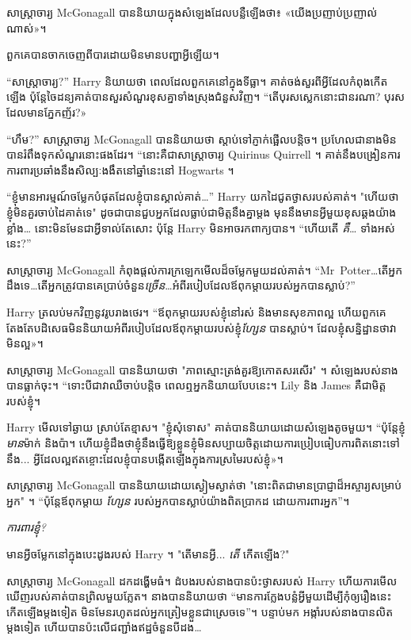 សាស្ត្រាចារ្យ McGonagall បាន​និយាយ​ក្នុង​សំឡេង​ដែល​បន្លឺ​ឡើង​ថា​៖ «យើង​ប្រញាប់​ប្រញាល់​ណាស់»។

ពួកគេបានចាកចេញពីបារដោយមិនមានបញ្ហាអ្វីឡើយ។

“សាស្រ្តាចារ្យ?” Harry និយាយ​ថា ពេល​ដែល​ពួក​គេ​នៅ​ក្នុង​ទីធ្លា។ គាត់​ចង់​សួរ​ពី​អ្វី​ដែល​កំពុង​កើត​ឡើង ប៉ុន្តែ​ចៃដន្យ​គាត់​បាន​សួរ​សំណួរ​ខុស​គ្នា​ទាំង​ស្រុង​ជំនួស​វិញ។ “តើបុរសស្លេកនោះជានរណា? បុរស​ដែល​មាន​ភ្នែក​ញ័រ​?»

“ហឹម?” សាស្រ្តាចារ្យ McGonagall បាននិយាយថា ស្តាប់ទៅភ្ញាក់ផ្អើលបន្តិច។ ប្រហែល​ជា​នាង​មិន​បាន​រំពឹង​ទុក​សំណួរ​នោះ​ផង​ដែរ។ “នោះគឺជាសាស្រ្តាចារ្យ Quirinus Quirrell ។ គាត់នឹងបង្រៀនការការពារប្រឆាំងនឹងសិល្បៈងងឹតនៅឆ្នាំនេះនៅ Hogwarts ។

“ខ្ញុំមានអារម្មណ៍ចម្លែកបំផុតដែលខ្ញុំបានស្គាល់គាត់…” Harry យកដៃជូតថ្ងាសរបស់គាត់។ "ហើយថាខ្ញុំមិនគួរចាប់ដៃគាត់ទេ" ដូច​ជា​បាន​ជួប​អ្នក​ដែល​ធ្លាប់​ជា​មិត្ត​នឹង​គ្នា​ម្តង មុន​នឹង​មាន​អ្វី​មួយ​ខុស​ឆ្គង​យ៉ាង​ខ្លាំង… នោះ​មិន​មែន​ជា​អ្វី​ទាល់​តែ​សោះ ប៉ុន្តែ Harry មិន​អាច​រក​ពាក្យ​បាន។ “ហើយតើ \emph{គឺ}… ទាំងអស់នេះ?”

សាស្រ្តាចារ្យ McGonagall កំពុងផ្តល់ការក្រឡេកមើលដ៏ចម្លែកមួយដល់គាត់។ “Mr~Potter…តើអ្នកដឹងទេ…តើអ្នកត្រូវបានគេប្រាប់ចំនួន\emph{ច្រើន}…អំពីរបៀបដែលឪពុកម្តាយរបស់អ្នកបានស្លាប់?”

Harry ត្រលប់មកវិញនូវរូបរាងថេរ។ “ឪពុកម្តាយរបស់ខ្ញុំនៅរស់ និងមានសុខភាពល្អ ហើយពួកគេតែងតែបដិសេធមិននិយាយអំពីរបៀបដែលឪពុកម្តាយរបស់ខ្ញុំ\emph{ហ្សែន} បានស្លាប់។ ដែល​ខ្ញុំ​សន្និដ្ឋាន​ថា​វា​មិន​ល្អ»។

សាស្រ្តាចារ្យ McGonagall បាននិយាយថា "ភាពស្មោះត្រង់គួរឱ្យកោតសរសើរ" ។ សំឡេងរបស់នាងបានធ្លាក់ចុះ។ “ទោះបីជាវាឈឺចាប់បន្តិច ពេលឮអ្នកនិយាយបែបនេះ។ Lily និង James គឺជាមិត្តរបស់ខ្ញុំ។

Harry មើលទៅឆ្ងាយ ស្រាប់តែខ្មាស។ "ខ្ញុំសុំទោស" គាត់បាននិយាយដោយសំឡេងតូចមួយ។ “ប៉ុន្តែខ្ញុំ\emph{មាន}ម៉ាក់ និងប៉ា។ ហើយ​ខ្ញុំ​ដឹង​ថា​ខ្ញុំ​នឹង​ធ្វើ​ឱ្យ​ខ្លួន​ខ្ញុំ​មិន​សប្បាយ​ចិត្ត​ដោយ​ការ​ប្រៀបធៀប​ការពិត​នោះ​ទៅ​នឹង... អ្វី​ដែល​ល្អ​ឥត​ខ្ចោះ​ដែល​ខ្ញុំ​បាន​បង្កើត​ឡើង​ក្នុង​ការ​ស្រមៃ​របស់​ខ្ញុំ​»។

សាស្ត្រាចារ្យ McGonagall បាននិយាយដោយស្ងៀមស្ងាត់ថា "នោះពិតជាមានប្រាជ្ញាដ៏អស្ចារ្យសម្រាប់អ្នក" ។ “ប៉ុន្តែឪពុកម្តាយ \emph{ហ្សែន} របស់អ្នកបានស្លាប់យ៉ាងពិតប្រាកដ ដោយការពារអ្នក”។

\emph{ការពារខ្ញុំ?}

មាន​អ្វី​ចម្លែក​នៅ​ក្នុង​បេះដូង​របស់ Harry ។ "តើមានអ្វី... \emph{តើ} កើតឡើង?"

សាស្រ្តាចារ្យ McGonagall ដកដង្ហើមធំ។ ដំបងរបស់នាងបានប៉ះថ្ងាសរបស់ Harry ហើយការមើលឃើញរបស់គាត់បានព្រិលមួយភ្លែត។ នាង​បាន​និយាយ​ថា “មាន​ការ​ក្លែង​បន្លំ​អ្វី​មួយ​ដើម្បី​កុំ​ឲ្យ​រឿង​នេះ​កើត​ឡើង​ម្តង​ទៀត មិនមែន​រហូត​ដល់​អ្នក​ត្រៀម​ខ្លួន​ជា​ស្រេច​ទេ”។ បន្ទាប់មក អង្កាំរបស់នាងបានលិតម្តងទៀត ហើយបានប៉ះលើជញ្ជាំងឥដ្ឋចំនួនបីដង…

